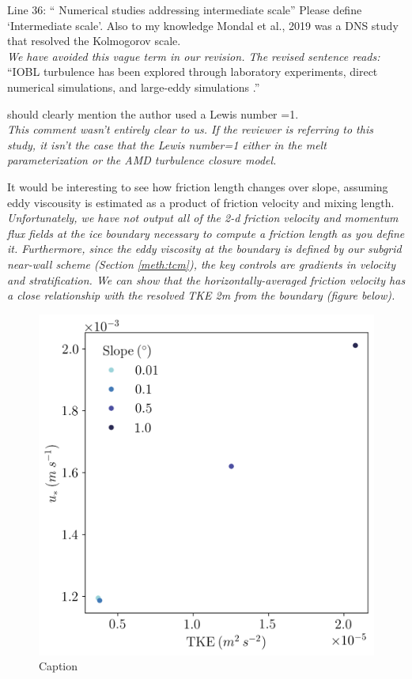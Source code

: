 \documentclass[tc, manuscript]{copernicus}
\begin{document}
Line 36: “ Numerical studies addressing intermediate scale”
Please define ‘Intermediate scale’. Also to my knowledge Mondal et al., 2019 was a DNS study that resolved the Kolmogorov scale.\\
\textit{We have avoided this vague term in our revision. The revised sentence reads:}\\
``IOBL turbulence has been explored through laboratory experiments, direct numerical simulations, and large-eddy simulations \citep{middleton_numerical_2021, mondal_ablation_2019, vreugdenhil_stratification_2019, mcconnochie_dissolution_2018}.''

should clearly mention the author used a Lewis number =1.\\
\textit{This comment wasn't entirely clear to us. If the reviewer is referring to this study, it isn't the case that the Lewis number=1 either in the melt parameterization or the AMD turbulence closure model.}

It would be interesting to see how friction length changes over slope, assuming eddy viscousity is estimated as a product of friction velocity and mixing length.\\
\textit{Unfortunately, we have not output all of the 2-d friction velocity and momentum flux fields at the ice boundary necessary to compute a friction length as you define it. Furthermore, since the eddy viscosity at the boundary is defined by our subgrid near-wall scheme (Section \ref{meth:tcm}), the key controls are gradients in velocity and stratification. We can show that the horizontally-averaged friction velocity has a close relationship with the resolved TKE 2m from the boundary (figure below). }
\begin{figure}
    \centering
    \includegraphics{Figures/us_eres_dslope_t43h_tav13h_fit.png}
    \caption{Caption}
    \label{fig:R1}
\end{figure}
\end{document}
